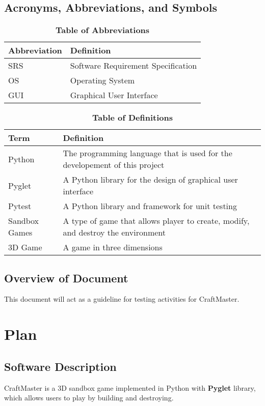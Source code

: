 \documentclass[12pt, titlepage]{article}
\begin{document}
\subsection{Acronyms, Abbreviations, and Symbols}
\FloatBarrier
\begin{table}[hbp]
\begin{tabularx}{\textwidth}{p{3cm}X}
\toprule
\textbf{Abbreviation} & \textbf{Definition} \\
\midrule
SRS & Software Requirement Specification\\
OS & Operating System\\
GUI & Graphical User Interface\\
\bottomrule
\end{tabularx}
\caption{\textbf{Table of Abbreviations}} \label{Table}
\end{table}
\FloatBarrier
\FloatBarrier
\begin{table}[!htbp]

\begin{tabularx}{\textwidth}{p{3cm}X}
\toprule
\textbf{Term} & \textbf{Definition}\\
\midrule
Python & The programming language that is used for the developement of this project\\
Pyglet & A Python library for the design of graphical user interface\\
Pytest & A Python library and framework for unit testing\\
Sandbox Games & A type of game that allows player to create, modify, and destroy the environment\\
3D Game & A game in three dimensions\\

\bottomrule
\end{tabularx}
\caption{\textbf{Table of Definitions}} \label{Table}
\end{table}
\FloatBarrier
\subsection{Overview of Document}
This document will act as a guideline for testing activities for CraftMaster.
\section{Plan}

\subsection{Software Description}
    CraftMaster is a 3D sandbox game implemented in Python with \textbf{Pyglet} library, which allows users to play by building and destroying.
\end{document}
